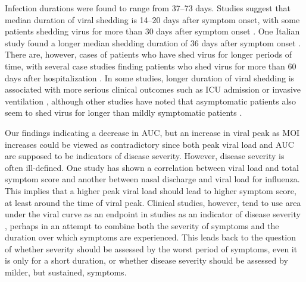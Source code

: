 Infection durations were found to range from 37--73 days. Studies suggest that median duration of viral shedding is 14--20 days after symptom onset, with some patients shedding virus for more than 30 days after symptom onset \citep{qi20, he20shed, zhou20, lee20}. One Italian study found a longer median shedding duration of 36 days after symptom onset \citep{mancuso20}. There are, however, cases of patients who have shed virus for longer periods of time, with several case studies finding patients who shed virus for more than 60 days after hospitalization \citep{park20, liu20, li20shed}. In some studies, longer duration of viral shedding is associated with more serious clinical outcomes such as ICU admission or invasive ventilation \citep{zeng20, lee20}, although other studies have noted that asymptomatic patients also seem to shed virus for longer than mildly symptomatic patients \citep{long20}.

Our findings indicating a decrease in AUC, but an increase in viral peak as MOI increases could be viewed as contradictory since both peak viral load and AUC are supposed to be indicators of disease severity. However, disease severity is often ill-defined. One study has shown a correlation between viral load and total symptom score \citep{chen12} and another between nasal discharge and viral load \citep{handel15} for influenza. This implies that a higher peak viral load should lead to higher symptom score, at least around the time of viral peak. Clinical studies, however, tend to use area under the viral curve as an endpoint in studies as an indicator of disease severity \citep{devincenzo20, hershberger19, stevens18, devincenzo15}, perhaps in an attempt to combine both the severity of symptoms and the duration over which symptoms are experienced. This leads back to the question of whether severity should be assessed by the worst period of symptoms, even it is only for a short duration, or whether disease severity should be assessed by milder, but sustained, symptoms.

